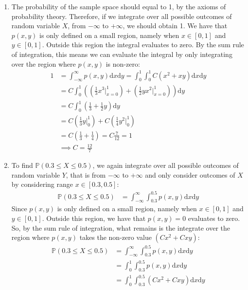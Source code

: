 \begin{enumerate}[label=\alph*.]
    \item
The probability of the sample space should equal to 1, by the axioms of probability theory. Therefore, if we integrate over all possible outcomes of random variable $X$, from $-\infty$ to $+\infty$, we should obtain 1. We have that $p(x, y)$ is only defined on a small region, namely when $x \in [0, 1]$ and $y \in [0, 1]$. Outside this region the integral evaluates to zero. By the sum rule of integration, this means we can evaluate the integral by only integrating over the region where $p(x, y)$ is non-zero:
\begin{align*}
1 &= \int_{-\infty}^{\infty} p(x, y) \mathrm d x \mathrm d y =  \int_0^1 \int_0^1 C (x^2 + xy) \mathrm d x \mathrm d y \\
&= C \int_0^1 \left( \left( \frac{1}{3} x^3\Big|_{x=0}^1 \right) + \left( \frac{1}{2} y x^2 \Big|_{x=0}^1 \right) \right) \mathrm d y \\
&= C \int_0^1 \left(\frac{1}{3} +\frac{1}{2} y \right) \mathrm d y \\
&= C \left(\frac{1}{3}y \Big|_0^1\right) + C \left(\frac{1}{4} y^2 \Big|_0^1 \right) \\
&= C \left( \frac{1}{3} + \frac{1}{4} \right) = C \frac{7}{12} = 1\\
&\implies C = \frac{12}{7}
\end{align*}
\item
To find $\mathbb{P}(0.3 \leq X \leq 0.5)$, we again integrate over all possible outcomes of random variable $Y$, that is from $-\infty$ to $+\infty$ and only consider outcomes of $X$ by considering range $x \in [0.3, 0.5]$:
\begin{align*}
\mathbb{P}(0.3 \leq X \leq 0.5)
&= \int_{-\infty}^{\infty} \int_{0.3}^{0.5} p(x, y) \mathrm d x \mathrm d y
\end{align*}
Since $p(x, y)$ is only defined on a small region, namely when $x \in [0, 1]$ and $y \in [0, 1]$. Outside this region, we have that $p(x, y){=}0$ evaluates to zero. So, by the sum rule of integration, what remains is the integrate over the region where $p(x, y)$ takes the non-zero value $(Cx^2 + Cxy)$:
\begin{align*}
\mathbb{P}(0.3 \leq X \leq 0.5)
&= \int_{-\infty}^{\infty} \int_{0.3}^{0.5} p(x, y) \mathrm d x \mathrm d y \\
&= \int_{0}^{1} \int_{0.3}^{0.5} p(x, y) \mathrm d x \mathrm d y \\
&= \int_0^1 \int_{0.3}^{0.5} \left(Cx^2 + Cxy\right) \mathrm d x \mathrm d y \\

\end{align*}
\end{enumerate}

